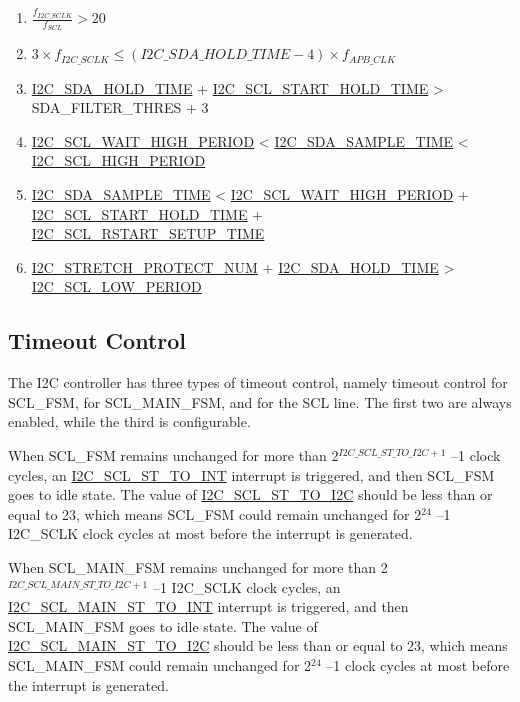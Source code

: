 \documentclass[main\_\_EN.tex]{subfiles}
\begin{document}
\begin{enumerate}
\item $\frac{f_{I2C\_SCLK}}{f_{SCL}}  > 20$
\item $3 \times f_{I2C\_SCLK} \leq (\hyperref[fielddesc:I2CSDAHOLDTIME]{I2C\_SDA\_HOLD\_TIME}-4) \times f_{APB\_CLK}$
\item \hyperref[fielddesc:I2CSDAHOLDTIME]{I2C\_SDA\_HOLD\_TIME} + \hyperref[fielddesc:I2CSCLSTARTHOLDTIME]{I2C\_SCL\_START\_HOLD\_TIME} > SDA\_FILTER\_THRES + 3
\item \hyperref[fielddesc:I2CSCLWAITHIGHPERIOD]{I2C\_SCL\_WAIT\_HIGH\_PERIOD} < \hyperref[fielddesc:I2CSDASAMPLETIME]{I2C\_SDA\_SAMPLE\_TIME} < \hyperref[fielddesc:I2CSCLHIGHPERIOD]{I2C\_SCL\_HIGH\_PERIOD}
\item \hyperref[fielddesc:I2CSDASAMPLETIME]{I2C\_SDA\_SAMPLE\_TIME} < \hyperref[fielddesc:I2CSCLWAITHIGHPERIOD]{I2C\_SCL\_WAIT\_HIGH\_PERIOD} + \hyperref[fielddesc:I2CSCLSTARTHOLDTIME]{I2C\_SCL\_START\_HOLD\_TIME} + \\\hyperref[fielddesc:I2CSCLRSTARTSETUPTIME]{I2C\_SCL\_RSTART\_SETUP\_TIME}
\item \hyperref[fielddesc:I2CSTRETCHPROTECTNUM]{I2C\_STRETCH\_PROTECT\_NUM} + \hyperref[fielddesc:I2CSDAHOLDTIME]{I2C\_SDA\_HOLD\_TIME} > \hyperref[fielddesc:I2CSCLLOWPERIOD]{I2C\_SCL\_LOW\_PERIOD}
\end{enumerate}

\subsection{Timeout Control}

The I2C controller has three types of timeout control, namely timeout control for SCL\_FSM, for SCL\_MAIN\_FSM, and for the SCL line. The first two are always enabled, while the third is configurable.

When SCL\_FSM remains unchanged for more than 2$^{\hyperref[fielddesc:I2CSCLSTTOI2C]{I2C\_SCL\_ST\_TO\_I2C}+1}$ –1 clock cycles, an \hyperref[int:i2c-scl-fsm]{I2C\_SCL\_ST\_TO\_INT} interrupt is triggered, and then SCL\_FSM goes to idle state. The value of \hyperref[fielddesc:I2CSCLSTTOI2C]{I2C\_SCL\_ST\_TO\_I2C} should be less than or equal to 23, which means SCL\_FSM could remain unchanged for 2$^{24}$ –1 I2C\_SCLK clock cycles at most before the interrupt is generated.

When SCL\_MAIN\_FSM remains unchanged for more than 2$^{ \hyperref[fielddesc:I2CSCLMAINSTTOI2C]{I2C\_SCL\_MAIN\_ST\_TO\_I2C}+1}$ –1 I2C\_SCLK clock cycles, an \hyperref[int:i2c-scl-main-fsm]{I2C\_SCL\_MAIN\_ST\_TO\_INT} interrupt is triggered, and then SCL\_MAIN\_FSM goes to idle state. The value of \hyperref[fielddesc:I2CSCLMAINSTTOI2C]{I2C\_SCL\_MAIN\_ST\_TO\_I2C} should be less than or equal to 23, which means SCL\_MAIN\_FSM could remain unchanged for 2$^{24}$ –1 clock cycles at most before the interrupt is generated.
\end{document}

